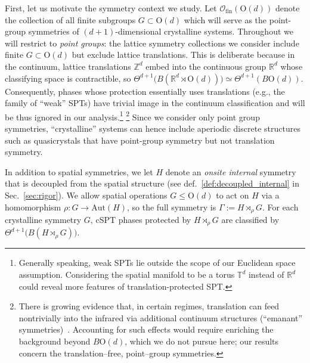 \documentclass[aps,prx,reprint,superscriptaddress,twocolumn,amsmath,amssymb,amsfonts, nofootinbib]{revtex4-2}
\newcommand{\On}{\text{O}}
\theoremstyle{apsstyle}
\begin{document}
First, let us motivate the symmetry context we study. Let $\mathcal{O}_{\mathrm{fin}}(\On(d))$ denote the collection of all finite subgroups $G\subset \On(d)$ which will serve as the point-group symmetries of $(d{+}1)$-dimensional crystalline systems.  Throughout we will restrict to \emph{point groups}: the lattice symmetry collections we consider include finite $G\subset \mathrm{O}(d)$ but exclude lattice translations. This is deliberate because in the continuum, lattice translations $\mathbb{Z}^{d}$ embed into the continuous group $\mathbb{R}^{d}$ whose classifying space is contractible, so
$\Theta^{d+1}\bigl(B(\mathbb{R}^{d}\rtimes \mathrm{O}(d))\bigr)\simeq \Theta^{d+1}(B\mathrm{O}(d))$. Consequently, phases whose protection essentially uses translations (e.g., the family of “weak” SPTs) have trivial image in the continuum classification and will be thus ignored in our analysis.\footnote{Generally speaking, weak SPTs lie outside the scope of our Euclidean space assumption. Considering the spatial manifold to be a torus $\mathbb{T}^d$ instead of $\mathbb{R}^d$ could reveal more features of translation-protected SPT.\cite{kitaev2009}} 
\footnote{There is growing evidence that, in certain regimes, translation can feed nontrivially into the infrared via additional continuum structures (“emanant” symmetries)~\cite{Seiberg_Shao}. Accounting for such effects would require enriching the background beyond $B\mathrm{O}(d)$, which we do not pursue here; our results concern the translation–free, point–group symmetries.} Since we consider only point group symmetries, “crystalline” systems can hence include aperiodic discrete structures such as quasicrystals that have point-group symmetry but not translation symmetry.


In addition to spatial symmetries, we let $H$ denote an \emph{onsite internal} symmetry that is decoupled from the spatial structure (see def.~\ref{def:decoupled_internal} in Sec.~\ref{sec:rigor}). We allow spatial operations $G\le \mathrm{O}(d)$ to act on $H$ via a homomorphism $\rho:G\to\mathrm{Aut}(H)$, so the full symmetry is $\Gamma:=H\rtimes_{\rho}G$. For each crystalline symmetry $G$, cSPT phases protected by $H\rtimes_{\rho} G$ are classified by $\Theta^{d+1}\bigl(B(H\rtimes_{\rho} G)\bigr)$. 
\bigskip 
\end{document}
